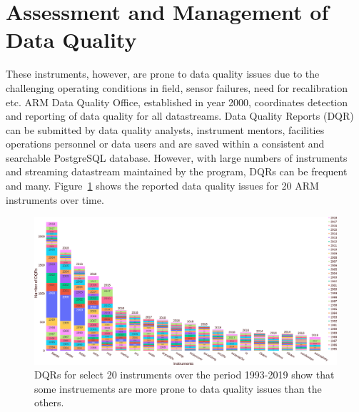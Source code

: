 \section{Assessment and Management of Data Quality}
These instruments, however, are prone to data quality issues due to
the challenging operating conditions in field, sensor failures, need for
recalibration etc. ARM Data Quality Office, established in year 2000,
coordinates detection and reporting of data quality for all datastreams.
Data Quality Reports (DQR) can be submitted by data quality analysts,
instrument mentors, facilities operations personnel or data users and
are saved within a consistent and searchable PostgreSQL database.
However, with large numbers of instruments and streaming datastream
maintained by the program, DQRs can be frequent and many. 
Figure~\ref{fig:dqr_by_instrument} shows the reported data quality
issues for 20 ARM instruments over time. 

\begin{figure}
 \includegraphics[width=\linewidth]{figures/dqr_by_instrument_20.png}
 \caption{DQRs for select 20 instruments over the period 1993-2019 show
	 that some instruements are more prone to data quality issues than
		 the others.}
 \label{fig:dqr_by_instrument}
\end{figure}

